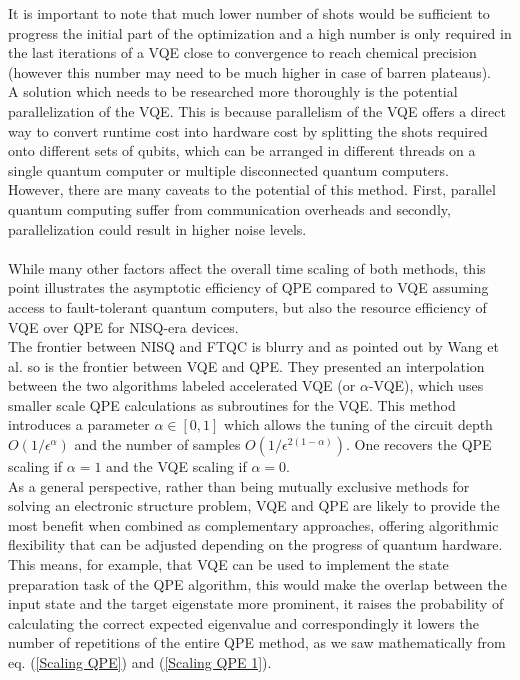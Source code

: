 It is important to note that much lower number of shots would be sufficient to progress the initial part of the optimization and a high number is only required in the last iterations of a VQE close to convergence to reach chemical precision (however this number may need to be much higher in case of barren plateaus). \\
A solution which needs to be researched more thoroughly is the potential parallelization of the VQE. This is because parallelism of the VQE offers a direct way to convert runtime cost into hardware cost by splitting the shots required onto different sets of qubits, which can be arranged in different threads on a single quantum computer or multiple disconnected quantum computers. \\
However, there are many caveats to the potential of this method. First, parallel quantum computing suffer from communication overheads and secondly, parallelization could result in higher noise levels. \\
\\
While many other factors affect the overall time scaling of both methods, this point illustrates the asymptotic efficiency of QPE compared to VQE assuming access to fault-tolerant quantum computers, but also the resource efficiency of VQE over QPE for NISQ-era devices. \\
The frontier between NISQ and FTQC is blurry and as pointed out by Wang et al. \cite{Wang2019Apr} so is the frontier between VQE and QPE. They presented an interpolation between the two algorithms labeled accelerated VQE (or $\alpha$-VQE), which uses smaller scale QPE calculations as subroutines for the VQE. This method introduces a parameter $\alpha \in [0,1]$ which allows the tuning of the circuit depth $O(1/\epsilon^{\alpha})$ and the number of samples $O(1/\epsilon^{2(1-\alpha)})$. One recovers the QPE scaling if $\alpha = 1$ and the VQE scaling if $\alpha = 0$. \\
As a general perspective, rather than being mutually exclusive methods for solving an electronic structure problem, VQE and QPE are likely to provide the most benefit when combined as complementary approaches, offering algorithmic flexibility that can be adjusted depending on the progress of quantum hardware. This means, for example, that VQE can be used to implement the state preparation task of the QPE algorithm, this would make the overlap between the input state and the target eigenstate more prominent, it raises the probability of calculating the correct expected eigenvalue and correspondingly it lowers the number of repetitions of the entire QPE method, as we saw mathematically from eq. (\ref{Scaling QPE}) and (\ref{Scaling QPE 1}).

